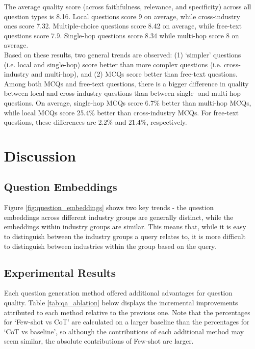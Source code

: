 The average quality score (across faithfulness, relevance, and specificity) across all question types is 8.16. Local questions score 9 on average, while cross-industry ones score 7.32. Multiple-choice questions score 8.42 on average, while free-text questions score 7.9. Single-hop questions score 8.34 while multi-hop score 8 on average. \\

Based on these results, two general trends are observed: (1) `simpler' questions (i.e. local and single-hop) score better than more complex questions (i.e. cross-industry and multi-hop), and (2) MCQs score better than free-text questions. Among both MCQs and free-text questions, there is a bigger difference in quality between local and cross-industry questions than between single- and multi-hop questions. On average, single-hop MCQs score 6.7\% better than multi-hop MCQs, while local MCQs score 25.4\% better than cross-industry MCQs. For free-text questions, these differences are 2.2\% and 21.4\%, respectively. 


\section{Discussion}

\subsection{Question Embeddings}

Figure \ref{fig:question_embeddings} shows two key trends - the question embeddings across different industry groups are generally distinct, while the embeddings within industry groups are similar. This means that, while it is easy to distinguish between the industry groups a query relates to, it is more difficult to distinguish between industries within the group based on the query.



\subsection{Experimental Results} \label{qa_experiments_discussion}


Each question generation method offered additional advantages for question quality. Table \ref{tab:qa_ablation} below displays the incremental improvements attributed to each method relative to the previous one. Note that the percentages for `Few-shot vs CoT' are calculated on a larger baseline than the percentages for `CoT vs baseline', so although the contributions of each additional method may seem similar, the absolute contributions of Few-shot are larger. 

